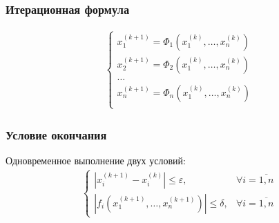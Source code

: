 \subsubsection*{Итерационная формула}
\begin{align}
	\begin{cases}\label{eq:common-iter-formula}
		x_1^{(k+1)} = \Phi_1(x_1^{(k)},\dots,x_n^{(k)}) \\
		x_2^{(k+1)} = \Phi_2(x_1^{(k)},\dots,x_n^{(k)}) \\
		\dots                                           \\
		x_n^{(k+1)} = \Phi_n(x_1^{(k)},\dots,x_n^{(k)}) \\
	\end{cases}
\end{align}


\subsubsection*{Условие окончания}
Одновременное выполнение двух условий:
\begin{align}
	\begin{cases}
		|x_i^{(k+1)} - x_i^{(k)}| \leq \varepsilon,       & \forall i = \overline{1,n} \\
		|f_i(x_1^{(k+1)},\dots,x_n^{(k+1)})| \leq \delta, & \forall i = \overline{1,n}
	\end{cases}
\end{align}

